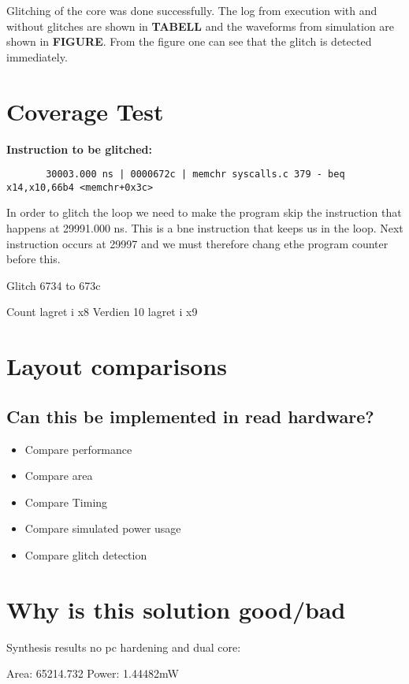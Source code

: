 Glitching of the core was done successfully. The log from execution with and without glitches are shown in \textbf{TABELL} and the waveforms from simulation are shown in \textbf{FIGURE}. From the figure one can see that the glitch is detected immediately. 

\section{Coverage Test}
\label{sec:cov_test_result}



\textbf{Instruction to be glitched:}
\begin{lstlisting}
       30003.000 ns | 0000672c | memchr syscalls.c 379 - beq x14,x10,66b4 <memchr+0x3c>
\end{lstlisting}

In order to glitch the loop we need to make the program skip the instruction that happens at 29991.000 ns. This is a bne instruction that keeps us in the loop. Next instruction occurs at 29997 and we must therefore chang ethe program counter before this. 

Glitch 6734 to 673c

Count lagret i x8 
Verdien 10 lagret i x9

\section{Layout comparisons}

\subsection{Can this be implemented in read hardware?}
\begin{itemize}
    \item Compare performance 
    \item Compare area
    \item Compare Timing 
    \item Compare simulated power usage
    \item Compare glitch detection
\end{itemize}

\section{Why is this solution good/bad}

Synthesis results no pc hardening and dual core:

Area: 65214.732
Power: 1.44482mW
